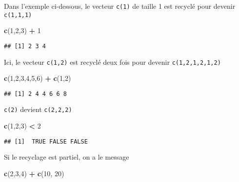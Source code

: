 \documentclass[]{book}
\newenvironment{Shaded}{\begin{snugshade}}{\end{snugshade}}
\newcommand{\DecValTok}[1]{\textcolor[rgb]{0.00,0.00,0.81}{#1}}
\newcommand{\KeywordTok}[1]{\textcolor[rgb]{0.13,0.29,0.53}{\textbf{#1}}}
\newcommand{\NormalTok}[1]{#1}
\newcommand{\OperatorTok}[1]{\textcolor[rgb]{0.81,0.36,0.00}{\textbf{#1}}}
\newcommand{\StringTok}[1]{\textcolor[rgb]{0.31,0.60,0.02}{#1}}
\begin{document}
Dans l'exemple ci-dessous, le vecteur \texttt{c(1)} de taille 1 est recyclé pour devenir \texttt{c(1,1,1)}

\begin{Shaded}
\begin{Highlighting}[]
\KeywordTok{c}\NormalTok{(}\DecValTok{1}\NormalTok{,}\DecValTok{2}\NormalTok{,}\DecValTok{3}\NormalTok{) }\OperatorTok{+}\StringTok{ }\DecValTok{1}
\end{Highlighting}
\end{Shaded}

\begin{verbatim}
## [1] 2 3 4
\end{verbatim}

Ici, le vecteur \texttt{c(1,2)} est recyclé deux fois pour devenir \texttt{c(1,2,1,2,1,2)}

\begin{Shaded}
\begin{Highlighting}[]
\KeywordTok{c}\NormalTok{(}\DecValTok{1}\NormalTok{,}\DecValTok{2}\NormalTok{,}\DecValTok{3}\NormalTok{,}\DecValTok{4}\NormalTok{,}\DecValTok{5}\NormalTok{,}\DecValTok{6}\NormalTok{) }\OperatorTok{+}\StringTok{ }\KeywordTok{c}\NormalTok{(}\DecValTok{1}\NormalTok{,}\DecValTok{2}\NormalTok{)}
\end{Highlighting}
\end{Shaded}

\begin{verbatim}
## [1] 2 4 4 6 6 8
\end{verbatim}

\texttt{c(2)} devient \texttt{c(2,2,2)}

\begin{Shaded}
\begin{Highlighting}[]
\KeywordTok{c}\NormalTok{(}\DecValTok{1}\NormalTok{,}\DecValTok{2}\NormalTok{,}\DecValTok{3}\NormalTok{) }\OperatorTok{<}\StringTok{ }\DecValTok{2}
\end{Highlighting}
\end{Shaded}

\begin{verbatim}
## [1]  TRUE FALSE FALSE
\end{verbatim}

Si le recyclage est partiel, on a le message

\begin{Shaded}
\begin{Highlighting}[]
\KeywordTok{c}\NormalTok{(}\DecValTok{2}\NormalTok{,}\DecValTok{3}\NormalTok{,}\DecValTok{4}\NormalTok{) }\OperatorTok{+}\StringTok{ }\KeywordTok{c}\NormalTok{(}\DecValTok{10}\NormalTok{, }\DecValTok{20}\NormalTok{)}
\end{Highlighting}
\end{Shaded}
\end{document}
